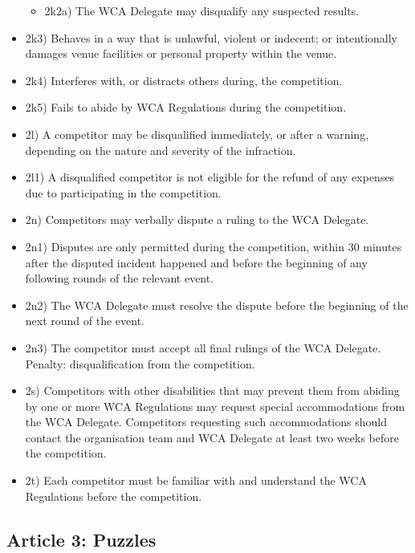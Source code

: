 \begin{itemize}
  \begin{itemize}
  \item
    2k2a) The WCA Delegate may disqualify any suspected results.
  \end{itemize}
\item
  2k3) Behaves in a way that is unlawful, violent or indecent; or
  intentionally damages venue facilities or personal property within the
  venue.
\item
  2k4) Interferes with, or distracts others during, the competition.
\item
  2k5) Fails to abide by WCA Regulations during the competition.
\item
  2l) A competitor may be disqualified immediately, or after a warning,
  depending on the nature and severity of the infraction.
\item
  2l1) A disqualified competitor is not eligible for the refund of any
  expenses due to participating in the competition.
\item
  2n) Competitors may verbally dispute a ruling to the WCA Delegate.
\item
  2n1) Disputes are only permitted during the competition, within 30
  minutes after the disputed incident happened and before the beginning
  of any following rounds of the relevant event.
\item
  2n2) The WCA Delegate must resolve the dispute before the beginning of
  the next round of the event.
\item
  2n3) The competitor must accept all final rulings of the WCA Delegate.
  Penalty: disqualification from the competition.
\item
  2s) Competitors with other disabilities that may prevent them from
  abiding by one or more WCA Regulations may request special
  accommodations from the WCA Delegate. Competitors requesting such
  accommodations should contact the organisation team and WCA Delegate
  at least two weeks before the competition.
\item
  2t) Each competitor must be familiar with and understand the WCA
  Regulations before the competition.
\end{itemize}

\subsection{ Article 3: Puzzles}

